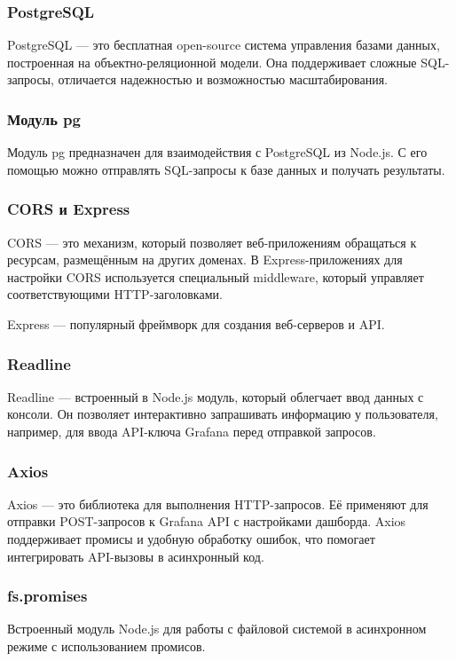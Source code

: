 \documentclass[14pt]{extarticle}
\begin{document}
\subsubsection*{PostgreSQL}
PostgreSQL — это бесплатная open-source система управления базами данных, построенная на объектно-реляционной модели. Она поддерживает сложные SQL-запросы, отличается надежностью и возможностью масштабирования.

\subsubsection*{Модуль pg}
Модуль pg предназначен для взаимодействия с PostgreSQL из Node.js. С его помощью можно отправлять SQL-запросы к базе данных и получать результаты.

\subsubsection*{CORS и Express}
CORS — это механизм, который позволяет веб-приложениям обращаться к ресурсам, размещённым на других доменах. В Express-приложениях для настройки CORS используется специальный middleware, который управляет соответствующими HTTP-заголовками.

Express — популярный фреймворк для создания веб-серверов и API.

\subsubsection*{Readline}
Readline — встроенный в Node.js модуль, который облегчает ввод данных с консоли. Он позволяет интерактивно запрашивать информацию у пользователя, например, для ввода API-ключа Grafana перед отправкой запросов.

\subsubsection*{Axios}
Axios — это библиотека для выполнения HTTP-запросов. Её применяют для отправки POST-запросов к Grafana API с настройками дашборда. Axios поддерживает промисы и удобную обработку ошибок, что помогает интегрировать API-вызовы в асинхронный код.

\subsubsection*{fs.promises}
Встроенный модуль Node.js для работы с файловой системой в асинхронном режиме с использованием промисов.
\end{document}
